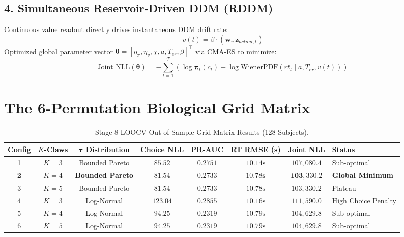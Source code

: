 \documentclass[11pt,a4paper]{article}
\begin{document}
\subsection{4. Simultaneous Reservoir-Driven DDM (RDDM)}
Continuous value readout directly drives instantaneous DDM drift rate:
\begin{equation}
v(t) = \beta \cdot (\mathbf{w}_v^\top \mathbf{z}_{action, t})
\end{equation}
Optimized global parameter vector $\boldsymbol{\theta} = [\eta_\pi, \eta_v, \chi, a, T_{er}, \beta]^\top$ via CMA-ES to minimize:
\begin{equation}
\text{Joint NLL}(\boldsymbol{\theta}) = -\sum_{t=1}^T \left( \log \boldsymbol{\pi}_t(c_t) + \log \text{WienerPDF}(rt_t \mid a, T_{er}, v(t)) \right)
\end{equation}

\section{The 6-Permutation Biological Grid Matrix}

\begin{table}[H]
\centering
\caption{Stage 8 LOOCV Out-of-Sample Grid Matrix Results (128 Subjects).}
\label{tab:grid_matrix}
\vspace{0.5em}
\small
\begin{tabular}{c c c c c c c p{2.2cm}}
\toprule
\textbf{Config} & \textbf{$K$-Claws} & \textbf{$\boldsymbol{\tau}$ Distribution} & \textbf{Choice NLL} & \textbf{PR-AUC} & \textbf{RT RMSE (s)} & \textbf{Joint NLL} & \textbf{Status} \\
\midrule
1 & $K = 3$ & Bounded Pareto & $85.52$ & $0.2751$ & $10.14\text{s}$ & $107,080.4$ & Sub-optimal \\
\textbf{2} & \textbf{$K = 4$} & \textbf{Bounded Pareto} & $\mathbf{81.54}$ & $\mathbf{0.2733}$ & $\mathbf{10.78\text{s}}$ & $\mathbf{103,330.2}$ & \textbf{Global Minimum} \\
3 & $K = 5$ & Bounded Pareto & $81.54$ & $0.2733$ & $10.78\text{s}$ & $103,330.2$ & Plateau \\
4 & $K = 3$ & Log-Normal & $123.04$ & $0.2855$ & $10.16\text{s}$ & $111,590.0$ & High Choice Penalty \\
5 & $K = 4$ & Log-Normal & $94.25$ & $0.2319$ & $10.79\text{s}$ & $104,629.8$ & Sub-optimal \\
6 & $K = 5$ & Log-Normal & $94.25$ & $0.2319$ & $10.79\text{s}$ & $104,629.8$ & Sub-optimal \\
\bottomrule
\end{tabular}
\end{table}
\end{document}
